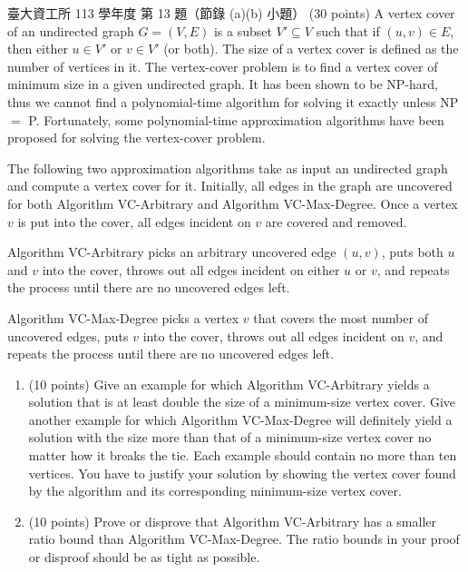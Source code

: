 \begin{pastexam}[label={px:apx-3}]{臺大資工所 113 學年度 第 13 題（節錄 (a)(b) 小題）}
(30 points) A vertex cover of an undirected graph $G=(V,E)$ is a subset $V'\subseteq V$ such that if
$(u,v)\in E$, then either $u\in V'$ or $v\in V'$ (or both). The size of a vertex cover is defined as the
number of vertices in it. The vertex-cover problem is to find a vertex cover of minimum size in a given
undirected graph. It has been shown to be NP-hard, thus we cannot find a polynomial-time algorithm for
solving it exactly unless NP $=$ P. Fortunately, some polynomial-time approximation algorithms have been
proposed for solving the vertex-cover problem.

The following two approximation algorithms take as input an undirected graph and compute a vertex cover for
it. Initially, all edges in the graph are uncovered for both Algorithm VC-Arbitrary and Algorithm
VC-Max-Degree. Once a vertex $v$ is put into the cover, all edges incident on $v$ are covered and removed.

Algorithm VC-Arbitrary picks an arbitrary uncovered edge $(u,v)$, puts both $u$ and $v$ into the cover,
throws out all edges incident on either $u$ or $v$, and repeats the process until there are no uncovered
edges left.

Algorithm VC-Max-Degree picks a vertex $v$ that covers the most number of uncovered edges, puts $v$ into the
cover, throws out all edges incident on $v$, and repeats the process until there are no uncovered edges left.
\begin{enumerate}[label=(\alph*)]
\item (10 points) Give an example for which Algorithm VC-Arbitrary yields a solution that is at least double
the size of a minimum-size vertex cover. Give another example for which Algorithm VC-Max-Degree will
definitely yield a solution with the size more than that of a minimum-size vertex cover no matter how it
breaks the tie. Each example should contain no more than ten vertices. You have to justify your solution by
showing the vertex cover found by the algorithm and its corresponding minimum-size vertex cover.
\item (10 points) Prove or disprove that Algorithm VC-Arbitrary has a smaller ratio bound than Algorithm
VC-Max-Degree. The ratio bounds in your proof or disproof should be as tight as possible.
\end{enumerate}
\end{pastexam}

